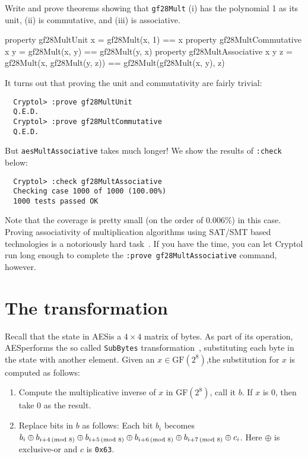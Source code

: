 \begin{Exercise}\label{ex:gf:2}
  Write and prove theorems showing that {\tt gf28Mult} (i) has the
  polynomial 1 as its unit, (ii) is commutative, and (iii) is
  associative.
\end{Exercise}
\begin{Answer}
\begin{code}
  property gf28MultUnit         x =      gf28Mult(x, 1) == x
  property gf28MultCommutative  x y =    gf28Mult(x, y) == gf28Mult(y, x)
  property gf28MultAssociative  x y z =  gf28Mult(x, gf28Mult(y, z))
                                         == gf28Mult(gf28Mult(x, y), z)
\end{code}
It turns out that proving the unit and commutativity are fairly
trivial:\indCmdProve
\begin{Verbatim}
  Cryptol> :prove gf28MultUnit 
  Q.E.D.
  Cryptol> :prove gf28MultCommutative
  Q.E.D.
\end{Verbatim}
But {\tt aesMultAssociative} takes much longer! We show the results of
{\tt :check} below:\indCmdCheck
\begin{Verbatim}
  Cryptol> :check gf28MultAssociative
  Checking case 1000 of 1000 (100.00%) 
  1000 tests passed OK
\end{Verbatim}
Note that the coverage is pretty small (on the order of $0.006\%$)
in this case. Proving associativity of multiplication algorithms using
SAT/SMT based technologies is a notoriously hard task~\cite[Section
6.3.1]{DecisionProcedures2008}. If you have the time, you can let
Cryptol run long enough to complete the {\tt :prove
  gf28MultAssociative} command, however.
\end{Answer}

\section{The {} transformation}
\label{aes:subbytes}


Recall that the state in AES\indAES is a $4\times4$ matrix of
bytes. As part of its operation, AES\indAES performs the so called
{\tt SubBytes} transformation\indAESSbox~\cite[Section 5.1.1]{aes},
substituting each byte in the state with another element. Given an $x
\in \mbox{GF}(2^8)$,\indGF the substitution for $x$ is computed as
follows:
\begin{enumerate}
\item Compute the multiplicative inverse of $x$ in GF$(2^8)$\indGF,
  call it $b$. If $x$ is 0, then take 0 as the result.
 \item Replace bits in $b$ as follows: Each bit $b_i$ becomes $b_i
   \oplus b_{i+4\imod{8}} \oplus b_{i+5\imod{8}} \oplus
   b_{i+6\imod{8}} \oplus b_{i+7\imod{8}} \oplus c_i$.  Here $\oplus$
   is exclusive-or and $c$ is {\tt 0x63}.
\end{enumerate}

